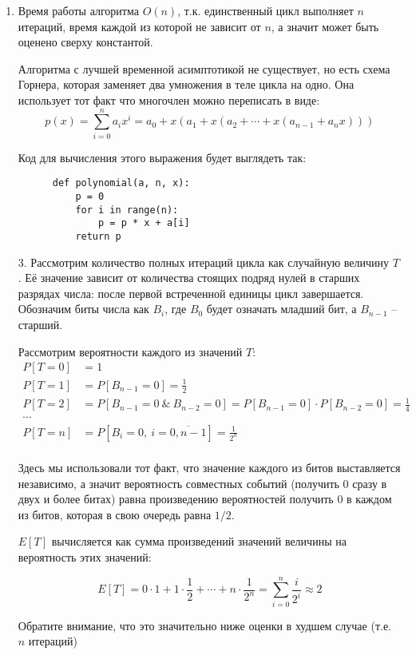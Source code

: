 \documentclass[12pt]{extarticle}
\begin{document}
\begin{enumerate}

  \item Время работы алгоритма $O(n)$, т.к. единственный цикл выполняет $n$ итераций, время каждой из которой не зависит от $n$, а значит может быть оценено сверху константой.
  
  Алгоритма с лучшей временной асимптотикой не существует, но есть схема Горнера, которая заменяет два умножения в теле цикла на одно. Она использует тот факт что многочлен можно переписать в виде:
  $$
  p(x) = \sum_{i=0}^{n} a_i x^i = a_0 + x(a_1 + x(a_2 + \cdots + x(a_{n-1} + a_n x)))
  $$
  
  Код для вычисления этого выражения будет выглядеть так:
  \begin{verbatim}
      def polynomial(a, n, x):
          p = 0
          for i in range(n):
              p = p * x + a[i]
          return p
  \end{verbatim}


  \item[3.] Рассмотрим количество полных итераций цикла как случайную величину $T$. Её значение зависит от количества стоящих подряд нулей в старших разрядах числа: после первой встреченной единицы цикл завершается. Обозначим биты числа как $B_i$, где $B_0$ будет означать младший бит, а $B_{n-1}$ -- старший.
  
  Рассмотрим вероятности каждого из значений $T$:
    \begin{equation}
    \begin{aligned}
    P[T=0]    & =  1 \\
    P[T=1]    & =  P[B_{n-1}=0] = \frac{1}{2} \\
    P[T=2]    & =  P[B_{n-1}=0 ~\&~ B_{n-2}=0] = P[B_{n-1}=0] \cdot P[B_{n-2}=0] = \frac{1}{4} \\
    \cdots \\
    P[T=n]    & =  P[B_{i}=0,~ i = \overline{0,n-1}] = \frac{1}{2^n}  \\
    \end{aligned}
    \end{equation}
    
  Здесь мы использовали тот факт, что значение каждого из битов выставляется независимо, а значит вероятность совместных событий (получить 0 сразу в двух и более битах) равна произведению вероятностей получить 0 в каждом из битов, которая в свою очередь равна $1/2$.
  
  $E[T]$ вычисляется как сумма произведений значений величины на вероятность этих значений:
  
  $$
  E[T] = 0 \cdot 1 + 1 \cdot \frac{1}{2} + \cdots + n \cdot \frac{1}{2^n}
  = \sum_{i=0}^{n} \frac{i}{2^i} \approx 2
  $$
  
  Обратите внимание, что это значительно ниже оценки в худшем случае (т.е. $n$ итераций)
\end{enumerate}
\end{document}
